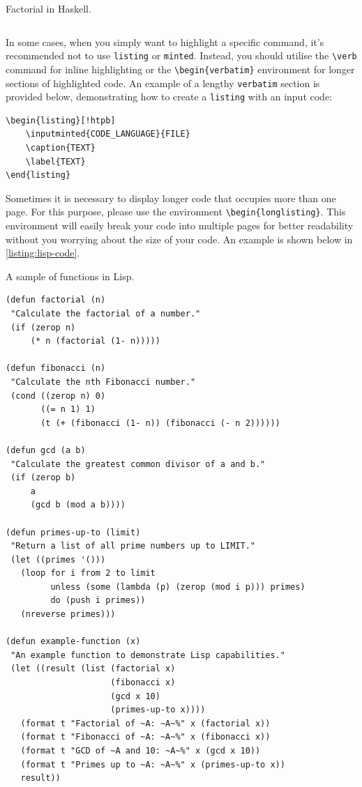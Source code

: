 {\begin{listing}[!htpb]
\caption{Factorial in Haskell.}
\label{listing:haskell-code}
\inputminted{haskell}{Code/Factorial.hs}
\end{listing}

In some cases, when you simply want to highlight a specific command, it's recommended not to use \verb|listing| or \verb|minted|. Instead, you should utilise the \verb|\verb| command for inline highlighting or the \verb|\begin{verbatim}| environment for longer sections of highlighted code. An example of a lengthy \verb|verbatim| section is provided below, demonstrating how to create a \verb|listing| with an input code:

\begin{verbatim}
\begin{listing}[!htpb]
    \inputminted{CODE_LANGUAGE}{FILE}
    \caption{TEXT}
    \label{TEXT}
\end{listing}
\end{verbatim}

Sometimes it is necessary to display longer code that occupies more than one page. For this purpose, please use the environment \verb|\begin{longlisting}|. This environment will easily break your code into multiple pages for better readability without you worrying about the size of your code. An example is shown below in \autoref{listing:lisp-code}.

\begin{longlisting}
\caption{A sample of functions in Lisp.}
\label{listing:lisp-code}
\begin{verbatim}
(defun factorial (n)
 "Calculate the factorial of a number."
 (if (zerop n)
     (* n (factorial (1- n)))))

(defun fibonacci (n)
 "Calculate the nth Fibonacci number."
 (cond ((zerop n) 0)
       ((= n 1) 1)
       (t (+ (fibonacci (1- n)) (fibonacci (- n 2))))))

(defun gcd (a b)
 "Calculate the greatest common divisor of a and b."
 (if (zerop b)
     a
     (gcd b (mod a b))))

(defun primes-up-to (limit)
 "Return a list of all prime numbers up to LIMIT."
 (let ((primes '()))
   (loop for i from 2 to limit
         unless (some (lambda (p) (zerop (mod i p))) primes)
         do (push i primes))
   (nreverse primes)))

(defun example-function (x)
 "An example function to demonstrate Lisp capabilities."
 (let ((result (list (factorial x)
                     (fibonacci x)
                     (gcd x 10)
                     (primes-up-to x))))
   (format t "Factorial of ~A: ~A~%" x (factorial x))
   (format t "Fibonacci of ~A: ~A~%" x (fibonacci x))
   (format t "GCD of ~A and 10: ~A~%" x (gcd x 10))
   (format t "Primes up to ~A: ~A~%" x (primes-up-to x))
   result))


\end{verbatim}
\end{longlisting}}
